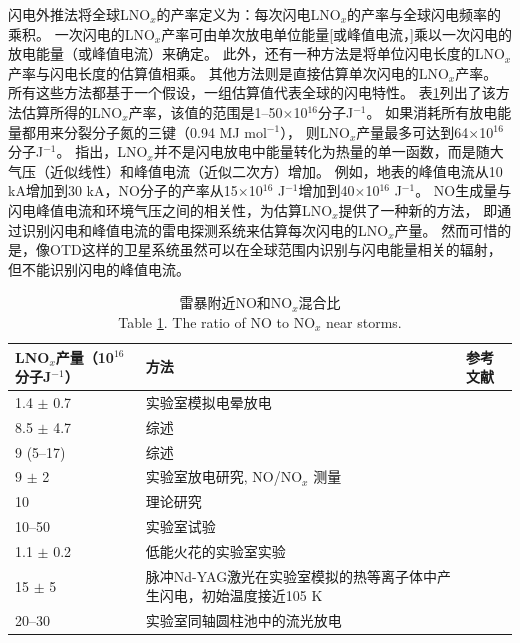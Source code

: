 闪电外推法将全球LNO$_x$的产率定义为：每次闪电LNO$_x$的产率与全球闪电频率的乘积\citep{Lawrence.1995}。
一次闪电的LNO$_x$产率可由单次放电单位能量[或峰值电流，\citet{Wang.1998}]乘以一次闪电的放电能量（或峰值电流）来确定。
此外，还有一种方法是将单位闪电长度的LNO$_x$产率与闪电长度的估算值相乘。
其他方法则是直接估算单次闪电的LNO$_x$产率。
所有这些方法都基于一个假设，一组估算值代表全球的闪电特性。
表\ref{table:LNOx/J}列出了该方法估算所得的LNO$_x$产率，该值的范围是1--50$\times$10$^{16}$分子J$^{-1}$。
如果消耗所有放电能量都用来分裂分子氮的三键（0.94 MJ mol$^{-1}$），
则LNO$_x$产量最多可达到64$\times$10$^{16}$分子J$^{-1}$。
\citet{Wang.1998}指出，LNO$_x$并不是闪电放电中能量转化为热量的单一函数，而是随大气压（近似线性）和峰值电流（近似二次方）增加。
例如，地表的峰值电流从10 kA增加到30 kA，NO分子的产率从15$\times$10$^{16}$ J$^{-1}$增加到40$\times$10$^{16}$ J$^{-1}$。
NO生成量与闪电峰值电流和环境气压之间的相关性，为估算LNO$_x$提供了一种新的方法，
即通过识别闪电和峰值电流的雷电探测系统来估算每次闪电的LNO$_x$产量。
然而可惜的是，像OTD这样的卫星系统虽然可以在全球范围内识别与闪电能量相关的辐射\citep{Baker.1999}，但不能识别闪电的峰值电流。

{
\centering
\footnotesize
\begin{longtable}
{|p{8em}|p{18em}|p{12em}|}
\caption{雷暴附近NO和NO$_x$混合比\\
Table \ref{table:LNOx/J}. The ratio of NO to NO$_x$ near storms.}
\label{table:LNOx/J} \\
\hline
LNO$_x$产量（10$^{16}$分子J$^{-1}$）   & 方法                          & 参考文献 \\ \hline
1.4 $\pm$ 0.7                                  & 实验室模拟电晕放电              & \citet{Hill.1988} \\ \hline
8.5 $\pm$ 4.7                                  & 综述                          & \citet{Lawrence.1995} \\ \hline
9 (5--17)                                    & 综述                          & \citet{Biazar.1995} \\ \hline
9 $\pm$ 2                                      & 实验室放电研究, NO/NO$_x$ 测量     & \citet{Stark.1996} \\ \hline
10                                           & 理论研究                      & \citet{Price.1997a,Price.1997b} \\ \hline
10--50                                       & 实验室试验                    & \citet{Wang.1998} \\ \hline
1.1 $\pm$ 0.2                                  & 低能火花的实验室实验            & \citet{Cook.2000} \\ \hline
15 $\pm$ 5    & 脉冲Nd-YAG激光在实验室模拟的热等离子体中产生闪电，初始温度接近105 K    & \citet{Navarro-Gonzalez.2001} \\ \hline
20--30      & 实验室同轴圆柱池中的流光放电                                       & \citet{Cooray.2005} \\ \hline
\end{longtable}\par
}


